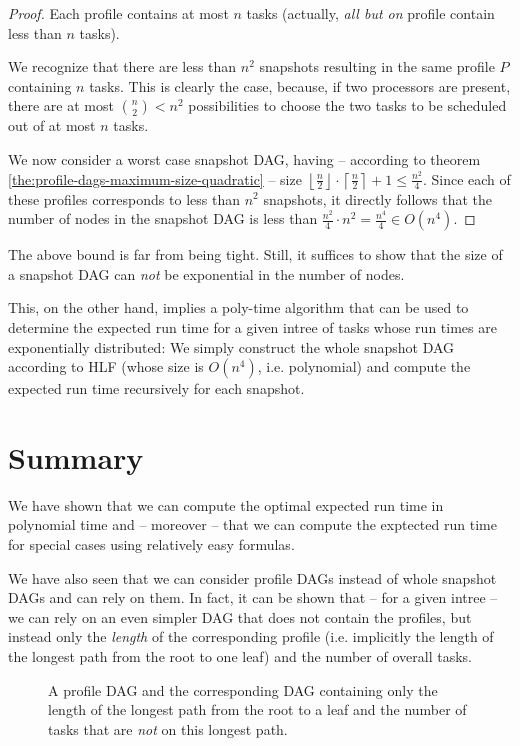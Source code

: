 \begin{proof}
  Each profile contains at most $n$ tasks (actually, \emph{all but on} profile contain less than $n$ tasks).

  We recognize that there are less than $n^2$ snapshots resulting in the same profile $P$ containing $n$ tasks. This is clearly the case, because, if two processors are present, there are at most $\binom{n}{2} < n^2$ possibilities to choose the two tasks to be scheduled out of at most $n$ tasks.

  \newcommand{\ceiln}{\left\lceil \frac{n}{2} \right\rceil}
  \newcommand{\floorn}{\left\lfloor \frac{n}{2} \right\rfloor}
  We now consider a worst case snapshot DAG, having -- according to theorem \ref{the:profile-dags-maximum-size-quadratic} -- size $\floorn \cdot \ceiln +1\leq \frac{n^2}{4}$. Since each of these profiles corresponds to less than $n^2$ snapshots, it directly follows that the number of nodes in the snapshot DAG is less than $\frac{n^2}{4}\cdot n^2=\frac{n^4}{4}\in O(n^4)$.
\end{proof}

The above bound is far from being tight. Still, it suffices to show that the size of a snapshot DAG can \emph{not} be exponential in the number of nodes.

This, on the other hand, implies a poly-time algorithm that can be used to determine the expected run time for a given intree of tasks whose run times are exponentially distributed: We simply construct the whole snapshot DAG according to HLF (whose size is $O(n^4)$, i.e. polynomial) and compute the expected run time recursively for each snapshot.

\section{Summary}
\label{sec:p2-summary}

We have shown that we can compute the optimal expected run time in polynomial time and -- moreover -- that we can compute the exptected run time for special cases using relatively easy formulas. 

We have also seen that we can consider profile DAGs instead of whole snapshot DAGs and can rely on them. In fact, it can be shown that -- for a given intree -- we can rely on an even simpler DAG that does not contain the profiles, but instead only the \emph{length} of the corresponding profile (i.e. implicitly the length of the longest path from the root to one leaf) and the number of overall tasks.

\begin{figure}[th]
  \centering
  \caption{A profile DAG and the corresponding DAG containing only the length of the longest path from the root to a leaf and the number of tasks that are \emph{not} on this longest path.}
  \label{fig:p2-chainside-summary}
\end{figure}


